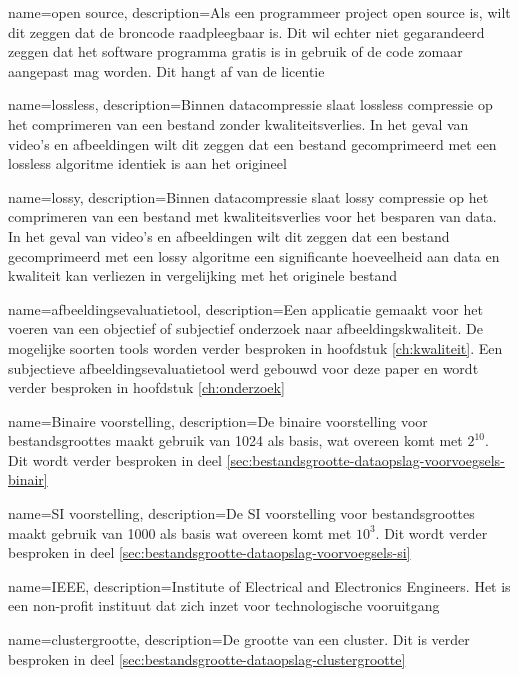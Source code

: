 {
	name={open source},
	description={Als een programmeer project open source is, wilt dit zeggen dat de broncode raadpleegbaar is. Dit wil echter niet gegarandeerd zeggen dat het software programma gratis is in gebruik of de code zomaar aangepast mag worden. Dit hangt af van de licentie}
}

{
	name={lossless},
	description={Binnen datacompressie slaat lossless compressie op het comprimeren van een bestand zonder kwaliteitsverlies. In het geval van video's en afbeeldingen wilt dit zeggen dat een bestand gecomprimeerd met een lossless algoritme identiek is aan het origineel}
}

{
	name={lossy},
	description={Binnen datacompressie slaat lossy compressie op het comprimeren van een bestand met kwaliteitsverlies voor het besparen van data. In het geval van video's en afbeeldingen wilt dit zeggen dat een bestand gecomprimeerd met een lossy algoritme een significante hoeveelheid aan data en kwaliteit kan verliezen in vergelijking met het originele bestand}
}

{
	name={afbeeldingsevaluatietool},
	description={Een applicatie gemaakt voor het voeren van een objectief of subjectief onderzoek naar afbeeldingskwaliteit. De mogelijke soorten tools worden verder besproken in hoofdstuk \ref{ch:kwaliteit}. Een subjectieve afbeeldingsevaluatietool werd gebouwd voor deze paper en wordt verder besproken in hoofdstuk \ref{ch:onderzoek}}
}

{
	name={Binaire voorstelling},
	description={De binaire voorstelling voor bestandsgroottes maakt gebruik van 1024 als basis, wat overeen komt met $ 2^{10} $. Dit wordt verder besproken in deel \ref{sec:bestandsgrootte-dataopslag-voorvoegsels-binair}}
}

{
	name={SI voorstelling},
	description={De SI voorstelling voor bestandsgroottes maakt gebruik van 1000 als basis wat overeen komt met $ 10^{3} $. Dit wordt verder besproken in deel \ref{sec:bestandsgrootte-dataopslag-voorvoegsels-si}}
}

{
	name={IEEE},
	description={Institute of Electrical and Electronics Engineers. Het is een non-profit instituut dat zich inzet voor technologische vooruitgang}
}

{
	name={clustergrootte},
	description={De grootte van een cluster. Dit is verder besproken in deel \ref{sec:bestandsgrootte-dataopslag-clustergrootte}}
}

